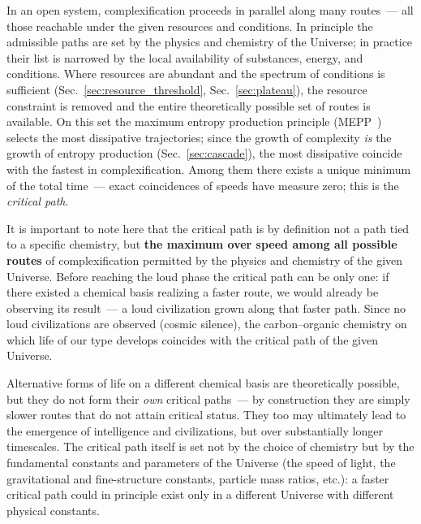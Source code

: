 \documentclass[11pt,a4paper]{article}
\begin{document}
In an open system, complexification proceeds in parallel along many routes~--- all those reachable under the given resources and conditions. In principle the admissible paths are set by the physics and chemistry of the Universe; in practice their list is narrowed by the local availability of substances, energy, and conditions. Where resources are abundant and the spectrum of conditions is sufficient (Sec.~\ref{sec:resource_threshold}, Sec.~\ref{sec:plateau}), the resource constraint is removed and the entire theoretically possible set of routes is available. On this set the maximum entropy production principle (MEPP~\cite{Martyushev,MartyushevSeleznev2006,Kleidon2010,Vallino2010}) selects the most dissipative trajectories; since the growth of complexity \emph{is} the growth of entropy production (Sec.~\ref{sec:cascade}), the most dissipative coincide with the fastest in complexification. Among them there exists a unique minimum of the total time~--- exact coincidences of speeds have measure zero; this is the \emph{critical path}.

It is important to note here that the critical path is by definition not a path tied to a specific chemistry, but \textbf{the maximum over speed among all possible routes} of complexification permitted by the physics and chemistry of the given Universe. Before reaching the loud phase the critical path can be only one: if there existed a chemical basis realizing a faster route, we would already be observing its result~--- a loud civilization grown along that faster path. Since no loud civilizations are observed (cosmic silence), the carbon--organic chemistry on which life of our type develops coincides with the critical path of the given Universe.

Alternative forms of life on a different chemical basis are theoretically possible, but they do not form their \emph{own} critical paths~--- by construction they are simply slower routes that do not attain critical status. They too may ultimately lead to the emergence of intelligence and civilizations, but over substantially longer timescales. The critical path itself is set not by the choice of chemistry but by the fundamental constants and parameters of the Universe (the speed of light, the gravitational and fine-structure constants, particle mass ratios, etc.): a faster critical path could in principle exist only in a different Universe with different physical constants.
\end{document}
